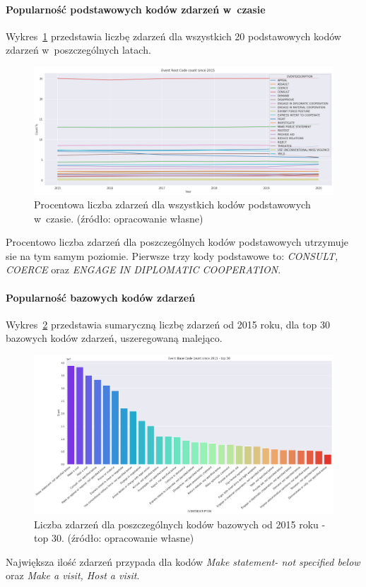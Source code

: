 \documentclass[11pt]{report}
\begin{document}
    \paragraph{Popularność podstawowych kodów zdarzeń w~czasie}
    Wykres~\ref{fig:GLOBALERCperc} przedstawia liczbę zdarzeń dla wszystkich 20 podstawowych kodów zdarzeń w~poszczególnych latach.
    \begin{figure}[!htp]
        \centering
        \includegraphics[width=\linewidth]{fig/GLOBAL/ERCperc.png}
        \caption{Procentowa liczba zdarzeń dla wszystkich kodów podstawowych w~czasie. (źródło: opracowanie własne)}
        \label{fig:GLOBALERCperc}
    \end{figure}
    Procentowo liczba zdarzeń dla poszczególnych kodów podstawowych utrzymuje sie na tym samym poziomie.
    Pierwsze trzy kody podstawowe to: \textit{CONSULT, COERCE} oraz \textit{ENGAGE IN DIPLOMATIC COOPERATION}.

    \paragraph{Popularność bazowych kodów zdarzeń}
    Wykres~\ref{fig:GLOBALEBC} przedstawia sumaryczną liczbę zdarzeń od 2015 roku, dla top 30 bazowych kodów zdarzeń, uszeregowaną malejąco.
    \begin{figure}[!htp]
        \centering
        \includegraphics[width=\linewidth]{fig/GLOBAL/EBC.png}
        \caption{Liczba zdarzeń dla poszczególnych kodów bazowych od 2015 roku - top 30. (źródło: opracowanie własne)}
        \label{fig:GLOBALEBC}
    \end{figure}
    Największa ilość zdarzeń przypada dla kodów \textit{Make statement- not specified below} oraz \textit{Make a visit, Host a visit}.
\end{document}
